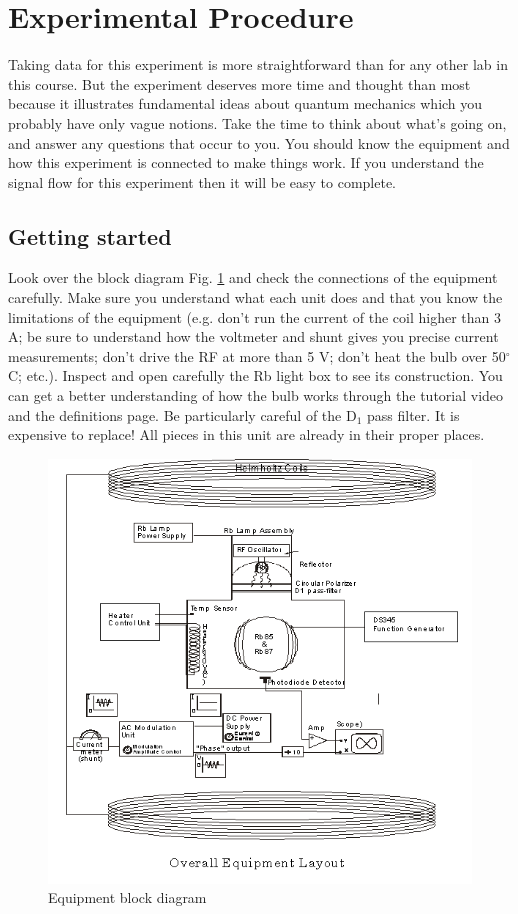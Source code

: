 \documentclass[11pt]{article}
\begin{document}
\section{Experimental Procedure}
Taking data for this experiment is more straightforward than for any other lab in this course. But the experiment deserves more time and thought than most because it illustrates fundamental ideas about quantum mechanics which you probably have only vague notions. Take the time to think about what's going on, and answer any questions that occur to you. You should know the equipment and how this experiment is connected to make things work. If you understand the signal flow for this experiment then it will be easy to complete.

\subsection{Getting started}
Look over the block diagram Fig. \ref{fig:diag} and check the connections of the equipment carefully.  Make sure you understand what each unit does and that you know the limitations of the equipment (e.g. don't run the current of the coil higher than 3 A; be sure to understand how the voltmeter and shunt gives you precise current measurements; don't drive the RF at more than 5 V; don't heat the bulb over 50$^\circ$C; etc.).  Inspect and open carefully the Rb light box to see its construction. You can get a better understanding of how the bulb works through the tutorial video and the definitions page. Be particularly careful of the D$_1$ pass filter. It is expensive to replace! All pieces in this unit are already in their proper places. 

\begin{figure}
\centering
\includegraphics[width=\textwidth]{figures/OPTimage001.png}
\caption{Equipment block diagram}
\label{fig:diag}
\end{figure}
\end{document}

